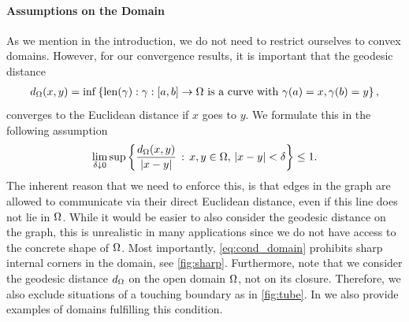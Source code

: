 \paragraph{Assumptions on the Domain} As we mention in the introduction, we do not need to restrict ourselves to convex domains. However, for our convergence results, it is important that the geodesic distance 
%
\begin{align*}
d_\Omega(x,y)=\inf\left\lbrace
\mathrm{len}(\gamma): \gamma:[a,b]\rightarrow\Omega 
\text{ is a curve with }
\gamma(a)=x, \gamma(b) = y
\right\rbrace,
\end{align*}
%
converges to the Euclidean distance if $x$ goes to $y$. We formulate this in the following assumption
%
\begin{align}\label{eq:cond_domain}
\lim_{\delta\downarrow0}\sup
\left\lbrace
\frac{d_\Omega(x,y)}{\left|x-y\right|}\,:\,
x,y\in\Omega,\,\left|x-y\right|<\delta\right\rbrace \leq 1.
\end{align}
%
The inherent reason that we need to enforce this, is that edges in the graph are allowed to communicate via their direct Euclidean distance, even if this line does not lie in $\Omega$. While it would be easier to also consider the geodesic distance on the graph, this is unrealistic in many applications since we do not have access to the concrete shape of $\Omega$. Most importantly, \cref{eq:cond_domain} prohibits sharp internal corners in the domain, see \cref{fig:sharp}. Furthermore, note that we consider the geodesic distance $d_\Omega$ on the open domain $\Omega$, not on its closure. Therefore, we also exclude situations of a touching boundary as in \cref{fig:tube}. In \cite{roith2022continuum} we also provide examples of domains fulfilling this condition.
%
